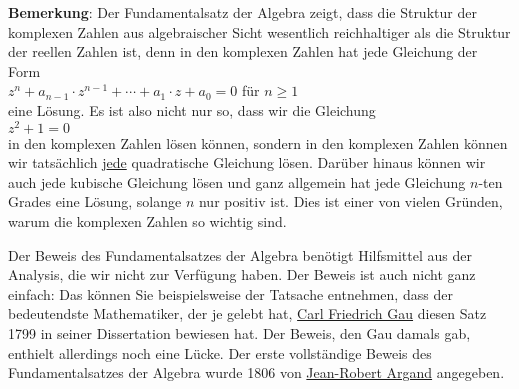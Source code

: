 \noindent
\textbf{Bemerkung}: Der Fundamentalsatz der Algebra zeigt, dass die Struktur der komplexen Zahlen
aus algebraischer Sicht wesentlich reichhaltiger als die Struktur der reellen Zahlen ist, denn in
den komplexen Zahlen hat jede Gleichung der Form
\\[0.2cm]
\hspace*{1.3cm}
$z^n + a_{n-1} \cdot z^{n-1} + \cdots + a_1 \cdot z + a_0 = 0$ \quad f\"{u}r $n \geq 1$
\\[0.2cm]
eine L\"{o}sung.  Es ist also nicht nur so, dass wir die Gleichung
\\[0.2cm]
\hspace*{1.3cm}
$z^2 + 1 = 0$
\\[0.2cm]
in den komplexen Zahlen l\"{o}sen k\"{o}nnen, sondern in den komplexen Zahlen k\"{o}nnen wir tats\"{a}chlich
j\underline{ede} quadratische Gleichung l\"{o}sen.  Dar\"{u}ber hinaus k\"{o}nnen wir auch jede kubische
Gleichung l\"{o}sen und ganz allgemein hat jede Gleichung $n$-ten Grades eine L\"{o}sung, solange $n$ nur
positiv ist.  Dies ist einer von vielen Gr\"{u}nden, warum die komplexen Zahlen so wichtig sind.
\vspace*{0.2cm}

\noindent
Der Beweis des Fundamentalsatzes der Algebra ben\"{o}tigt Hilfsmittel aus der Analysis, die wir nicht
zur Verf\"{u}gung haben.  Der Beweis ist auch nicht ganz einfach: Das k\"{o}nnen Sie beispielsweise der
Tatsache entnehmen, dass der bedeutendste Mathematiker, der je gelebt hat, 
\href{http://de.wikipedia.org/wiki/Carl_Friedrich_Gauss}{Carl Friedrich Gau\3}
diesen Satz 1799 in seiner Dissertation bewiesen hat.  Der Beweis, den Gau\3 damals gab, enthielt
allerdings noch eine L\"{u}cke.  Der erste vollst\"{a}ndige Beweis des Fundamentalsatzes der Algebra wurde 
1806 von \href{http://en.wikipedia.org/wiki/Jean-Robert_Argand}{Jean-Robert Argand} angegeben.

